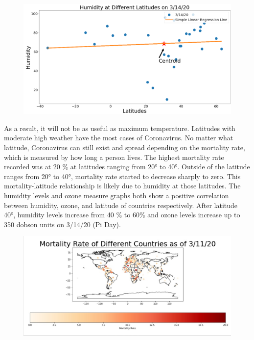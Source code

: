 \documentclass[10pt,journal,compsoc]{IEEEtran}
\begin{document}
{{\begin{figure}[!htbp] %
	\includegraphics[scale=0.5]{humidity-mar-centroid.png}\\
	\centering
	\label{LP-COVID-Humidity March 14th}
\end{figure}


	As a result, it will not be as useful as maximum temperature. Latitudes with moderate high weather have the most cases of Coronavirus. No matter what latitude, Coronavirus can still exist and spread depending on the mortality rate, which is measured by how long a person lives. The highest mortality rate recorded was at 20 \% at latitudes ranging from 20° to 40°. Outside of the latitude ranges from 20° to 40°, mortality rate started to decrease sharply to zero. This mortality-latitude relationship is likely due to humidity at those latitudes. The humidity levels and ozone measure graphs both show a positive correlation between humidity, ozone, and latitude of countries respectively. After latitude 40°, humidity levels increase from 40 \% to 60\% and ozone levels increase up to 350 dobson units on 3/14/20 (Pi Day).

\begin{figure}[!htbp] %
	\includegraphics[scale=0.19]{mortality-mar-11.png}\\
	\centering
	\label{LP-COVID-Mortality Rate March 11th}
\end{figure}

}}
\end{document}
